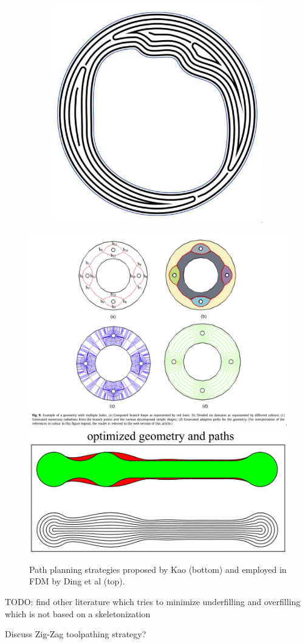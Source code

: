 \begin{figure}
\begin{subfigure}{0.45\columnwidth}
\includegraphics[width=\columnwidth]{sources/related_work/jin.jpg}
\caption{\citeauthor{Jin2017}}
\label{jin}
\end{subfigure}
\end{figure}

\begin{figure}
\centering
\includegraphics[width=\columnwidth]{sources/related_work/ding.jpg}
\includegraphics[width=.7\columnwidth]{sources/related_work/kao.jpg}
\caption{Path planning strategies proposed by Kao (bottom) and employed in FDM by Ding et al (top).}
\label{ding}
\end{figure}

TODO: find other literature which tries to minimize underfilling and overfilling which is not based on a skeletonization

Discuss Zig-Zag toolpathing strategy?